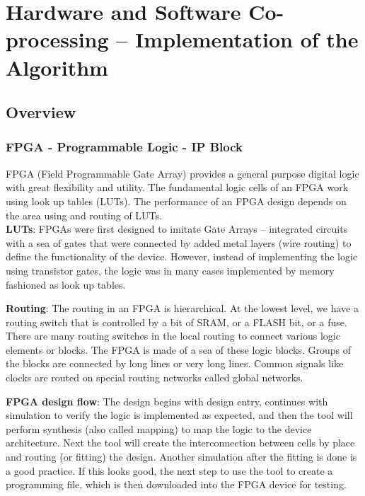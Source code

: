\chapter{Hardware and Software Co-processing – Implementation of the Algorithm}
\label{chap:HSC}

\section{Overview}

\subsection{FPGA - Programmable Logic - IP Block}

FPGA (Field Programmable Gate Array) provides a general purpose digital logic with great flexibility and utility. The fundamental logic cells of an FPGA work using look up tables (LUTs). The performance of an FPGA design depends on the area using and routing of LUTs\cite{Dummies}. \\

\noindent \textbf{LUTs}: FPGAs were first designed to imitate Gate Arrays – integrated circuits with a sea of gates that were connected by added metal layers (wire routing) to define the functionality of the device. However, instead of implementing the logic using transistor gates, the logic was in many cases implemented by memory fashioned as look up tables. \\


\noindent \textbf{Routing}: The routing in an FPGA is hierarchical. At the lowest level, we have a routing switch that is controlled by a bit of SRAM, or a FLASH bit, or a fuse. There are many routing switches in the local routing to connect various logic elements or blocks. The FPGA is made of a sea of these logic blocks. Groups of the blocks are connected by long lines or very long lines. Common signals like clocks are routed on special routing networks called global networks. \\


\noindent \textbf{FPGA design flow}: The design begins with design entry, continues with simulation to verify the logic is implemented as expected, and then the tool will perform synthesis (also called mapping) to map the logic to the device architecture. Next the tool will create the interconnection between cells by place and routing (or fitting) the design. Another simulation after the fitting is done is a good practice. If this looks good, the next step to use the tool to create a programming file, which is then downloaded into the FPGA device for testing\cite{Coursera}. \\

